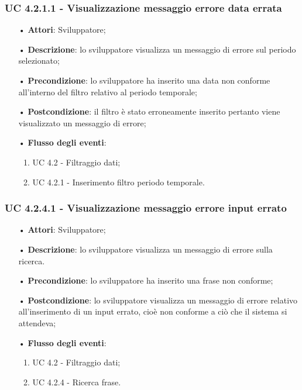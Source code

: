 \subsubsection{UC 4.2.1.1 - Visualizzazione messaggio errore data errata}
\begin{itemize}
	\item[•]\textbf{Attori}: Sviluppatore;
	\item[•]\textbf{Descrizione}: lo sviluppatore visualizza un messaggio di errore sul periodo selezionato;
	\item[•]\textbf{Precondizione}: lo sviluppatore ha inserito una data non conforme all'interno del filtro relativo al periodo temporale;
	\item[•]\textbf{Postcondizione}: il filtro è stato erroneamente inserito pertanto viene visualizzato un messaggio di errore;
	\item[•]\textbf{Flusso degli eventi}: 
	\begin{enumerate}
		\item UC 4.2 - Filtraggio dati;
		\item UC 4.2.1 - Inserimento filtro periodo temporale.
	\end{enumerate}
\end{itemize}
\subsubsection{UC 4.2.4.1 - Visualizzazione messaggio errore input errato}
\begin{itemize}
	\item[•]\textbf{Attori}: Sviluppatore;
	\item[•]\textbf{Descrizione}: lo sviluppatore visualizza un messaggio di errore sulla ricerca.
	\item[•]\textbf{Precondizione}: lo sviluppatore ha inserito una frase non conforme;
	\item[•]\textbf{Postcondizione}: lo sviluppatore visualizza un messaggio di errore relativo all'inserimento di un input errato, cioè non conforme a ciò che il sistema si attendeva;
	\item[•]\textbf{Flusso degli eventi}: 
	\begin{enumerate}
		\item UC 4.2 - Filtraggio dati;
		\item UC 4.2.4 - Ricerca frase.
	\end{enumerate}
\end{itemize}

  

